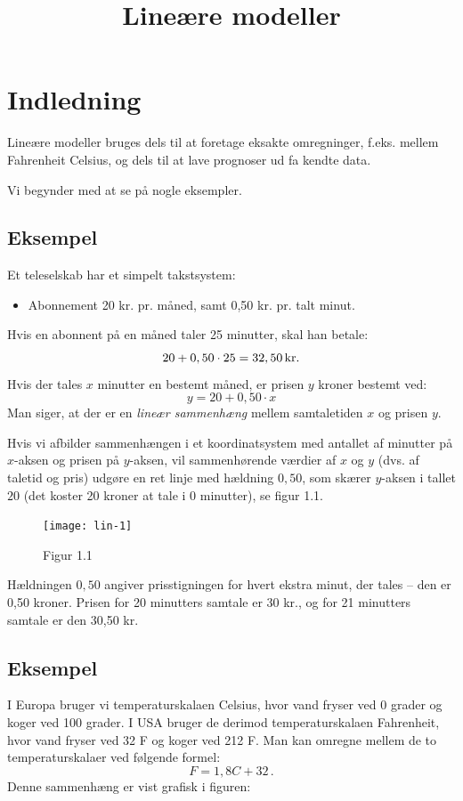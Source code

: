 \documentclass[12pt,oneside,a4paper]{article}
\title{Lineære modeller}
\date{\vspace{-5ex}}
\begin{document}
\maketitle


\section{Indledning}
Lineære modeller bruges dels til at foretage eksakte omregninger, f.eks. mellem Fahrenheit
Celsius, og dels til at lave prognoser ud fa kendte data.

Vi begynder med at se på nogle eksempler.

\subsection{Eksempel}
Et teleselskab har et simpelt takstsystem:
\begin{itemize}
    \item Abonnement 20 kr. pr. måned, samt 0,50 kr. pr. talt minut.
\end{itemize}
Hvis en abonnent på en måned taler 25 minutter, skal han betale:
$$
20 + 0,50\cdot25 = 32,50 \, {\rm kr}.
$$
Hvis der tales $x$ minutter en bestemt måned, er prisen $y$ kroner bestemt ved:
$$
y = 20 + 0,50\cdot x
$$
Man siger, at der er en {\em lineær sammenhæng} mellem samtaletiden $x$ og prisen $y$.

Hvis vi afbilder sammenhængen i et koordinatsystem med antallet af minutter på
$x$-aksen og prisen på $y$-aksen, vil sammenhørende værdier af $x$ og $y$ (dvs.
af taletid og pris) udgøre en ret linje med hældning $0,50$, som skærer
$y$-aksen i tallet $20$ (det koster 20 kroner at tale i 0 minutter), se figur
1.1.

\begin{figure}[H]
    \centering
    \texttt{[image: lin-1]}
    \caption{Figur 1.1}
\end{figure}

Hældningen $0,50$ angiver prisstigningen for hvert ekstra minut, der tales --
den er 0,50 kroner.  Prisen for 20 minutters samtale er 30 kr., og for 21
minutters samtale er den 30,50 kr.

\subsection{Eksempel}
I Europa bruger vi temperaturskalaen Celsius, hvor vand fryser ved 0 grader og
koger ved 100 grader.  I USA bruger de derimod temperaturskalaen Fahrenheit,
hvor vand fryser ved 32 F og koger ved 212 F.
Man kan omregne mellem de to temperaturskalaer ved følgende formel:
\[
F = 1,8 C + 32 \,.
\]
Denne sammenhæng er vist grafisk i figuren:
\end{document}
